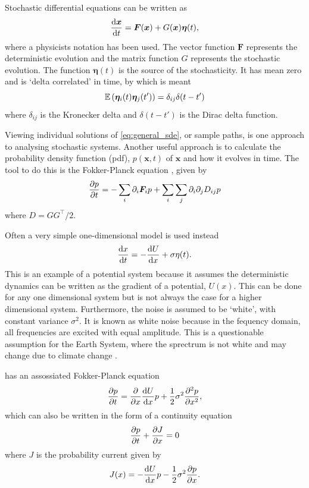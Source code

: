 Stochastic differential equations can be written \parencite{Jacobs2010} as
\begin{equation}
  \label{eq:general_sde}
  \dv{\bm{x}}{t} = \bm{F}(\bm{x}) + G(\bm{x})\bm{\eta}(t),
\end{equation}
where a physicists notation has been used. The vector function $\bm{F}$ represents the deterministic evolution and the matrix function $G$ represents the stochastic evolution. The function
$\bm{\eta}(t)$ is the source of the stochasticity. It has mean zero and is `delta correlated' in time, by which is meant
\begin{equation}
  \label{eq:eta_correlation}
  \operatorname*{\mathbb{E}}\left(\bm{\eta}_i(t)\bm{\eta}_j(t')\right) = \delta_{ij}\delta(t-t')
\end{equation}
where $\delta_{ij}$ is the Kronecker delta and $\delta(t-t')$ is the Dirac delta function.

Viewing individual solutions of \cref{eq:general_sde}, or sample paths, is one approach  to analysing stochastic systems. Another useful approach is to calculate the probability density function
(pdf), $p(\bm{x},t)$ of $\bm{x}$ and how it evolves in time. The tool to do this is the Fokker-Planck equation \parencite{Fokker1914,Planck1917}, given by
\begin{equation}
  \label{eq:fokker_planck}
  \pdv{p}{t} = - \sum_i \partial_i \bm{F}_i p + \sum_i\sum_j \partial_i\partial_j D_{ij} p
\end{equation}
where $D = GG^\intercal/2$.

Often a very simple one-dimensional model is used instead
\begin{equation}
  \label{eq:simple_sde}
  \dv{x}{t} = -\dv{U}{x} + \sigma \eta(t).
\end{equation}
This is an example of a potential system because it assumes the deterministic dynamics can be written as the gradient of a potential, $U(x)$. This can be done for any one dimensional system but is not
always the case for a higher dimensional system. Furthermore, the noise is assumed to be `white', with constant variance $\sigma^2$. It is known as white noise because in the fequency domain, all
frequencies are excited with equal amplitude. This is a questionable assumption for the Earth System, where the sprectrum is not white \parencite{Mitchell1976,VonderHeydt2021} and may
change due to climate change \parencite{Huntingford2013}.

 has an assossiated Fokker-Planck equation
\begin{equation}
  \label{eq:fokker_planck_one_d}
  \pdv{p}{t} = \pdv{x} \dv{U}{x}p + \frac{1}{2}\sigma^2 \pdv[2]{p}{x},
\end{equation}
which can also be written in the form of a continuity equation
\begin{equation}
  \label{eq:fokker_planck_continuity}
  \pdv{p}{t} + \pdv{J}{x} = 0
\end{equation}
where $J$ is the probability current given by
\begin{equation}
  \label{eq:probability_current}
  J(x) = -\dv{U}{x}p - \frac{1}{2}\sigma^2 \pdv{p}{x}.
\end{equation}

